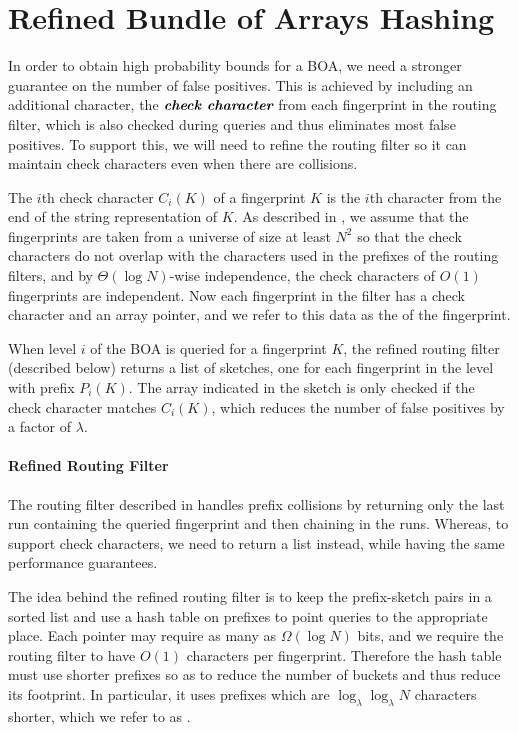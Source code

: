 \section{Refined Bundle of Arrays Hashing}\label{sec:boa-refined}

In order to obtain high probability bounds for a BOA, we need a stronger
guarantee on the number of false positives. This is achieved by including an
additional character, the $\emph{\textbf{\boldmath check character}}$ from each fingerprint in the
routing filter, which is also checked during queries and thus eliminates most
false positives.  To support this, we will need to refine the routing filter so
it can maintain check characters even when there are collisions.

The $i$th check character $C_i(K)$ of a fingerprint $K$ is the $i$th
character from the end of the string representation of $K$. As
described in , we assume that the fingerprints are
taken from a universe of size at least $N^2$ so that the check
characters do not overlap with the characters used in the prefixes of
the routing filters, and by $\Theta(\log N)$-wise independence, the
check characters of $O(1)$ fingerprints are independent. Now each
fingerprint in the filter has a check character and an array pointer,
and we refer to this data as the  of the fingerprint.

When level $i$ of the BOA is queried for a fingerprint $K$, the refined routing
filter (described below) returns a list of sketches, one for each fingerprint
in the level with prefix $P_i(K)$. The array indicated in the sketch is only
checked if the check character matches $C_i(K)$, which reduces the number of
false positives by a factor of $\lambda$.

\paragraph{Refined Routing Filter}
The routing filter described in  handles prefix
collisions by returning only the last run containing the queried fingerprint
and then chaining in the runs. Whereas, to support check characters, we need to
return a list instead, while having the same performance guarantees.

The idea behind the refined routing filter is to keep the prefix-sketch pairs
in a sorted list and use a hash table on prefixes to point queries to the
appropriate place. Each pointer may require as many as $\Omega(\log N)$ bits,
and we require the routing filter to have $O(1)$ characters per fingerprint.
Therefore the hash table must use shorter prefixes so as to reduce the number
of buckets and thus reduce its footprint. In particular, it uses prefixes which
are $\log_\lambda\log_\lambda N$ characters shorter, which we refer to as
.

